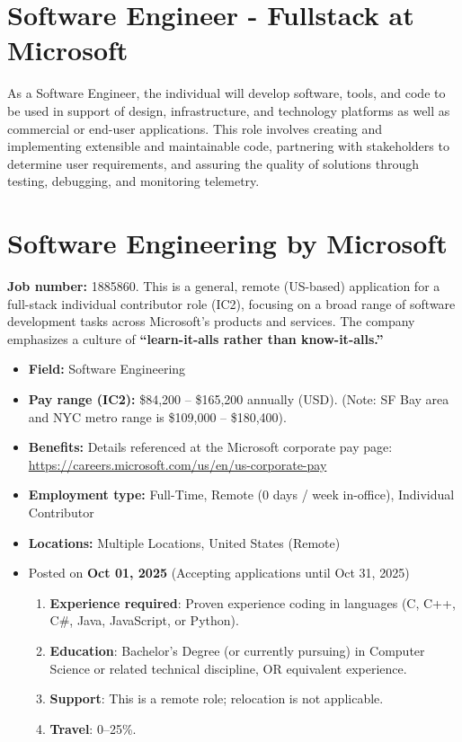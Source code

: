 \documentclass[11pt]{article}
\begin{document}


\section*{Software Engineer - Fullstack at Microsoft}

As a Software Engineer, the individual will develop software, tools, and 
code to be used in support of design, infrastructure, and technology 
platforms as well as commercial or end-user applications. This role involves 
creating and implementing extensible and maintainable code, partnering with 
stakeholders to determine user requirements, and assuring the quality of 
solutions through testing, debugging, and monitoring telemetry.

\section*{Software Engineering by \textbf{Microsoft}}
\textbf{Job number:} 1885860. This is a general, remote (US-based) 
application for a full-stack individual contributor role (IC2), 
focusing on a broad range of software development tasks across 
Microsoft's products and services. The company emphasizes a culture of 
\textbf{``learn-it-alls rather than know-it-alls.''}

\begin{itemize}
  \item \textbf{Field:} Software Engineering
  \item \textbf{Pay range (IC2):} \$84,200 -- \$165,200 annually (USD). 
    (Note: SF Bay area and NYC metro range is \$109,000 -- \$180,400).
  \item \textbf{Benefits:} Details referenced at the Microsoft corporate pay 
    page: \url{https://careers.microsoft.com/us/en/us-corporate-pay}
  \item \textbf{Employment type:} Full-Time, Remote (0 days / week 
    in-office), Individual Contributor
  \item \textbf{Locations:} Multiple Locations, United States (Remote)
  \item Posted on \textbf{Oct 01, 2025} (Accepting applications until 
    Oct 31, 2025)
  \begin{enumerate}[label=\arabic*., leftmargin=*]
    \item \textbf{Experience required}: Proven experience coding in 
      languages (C, C++, C\#, Java, JavaScript, or Python).
    \item \textbf{Education}: Bachelor's Degree (or currently pursuing) 
      in Computer Science or related technical discipline, OR equivalent 
      experience.
    \item \textbf{Support}: This is a remote role; relocation is not 
      applicable.
    \item \textbf{Travel}: 0--25\%.
  \end{enumerate}
\end{itemize}
\end{document}
